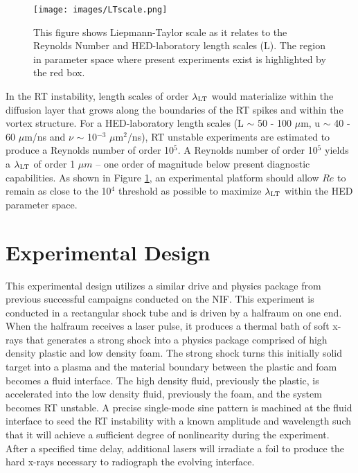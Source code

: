 \documentclass[%
 aip,
 amsmath,amssymb,
 reprint,
 floatfix
]{revtex4-1}
\begin{document}
 
  \begin{figure}
 \begin{center}
 \texttt{[image: images/LTscale.png]}
 \caption{This figure shows Liepmann-Taylor scale as it relates to the Reynolds Number and HED-laboratory length scales (L). The region in parameter space where present experiments exist is highlighted by the red box. } 
 \label{fig:LTscale}
 \end{center}
 \end{figure}

 In the RT instability, length scales of order $\lambda_{\rm{LT}}$ would materialize within the diffusion layer that grows along the boundaries of the RT spikes and within the vortex structure.\cite{Robey:2003} For a HED-laboratory length scales (L $\sim$  50 - 100 $\mu$m, u $\sim$ 40 - 60  $\mu$m/ns and $\nu$ $\sim$ 10$^{-3}$ $\mu$m$^2$/ns), RT unstable experiments are estimated to produce a Reynolds number of order 10$^5$. A Reynolds number of order 10$^5$ yields a $\lambda_{\rm{LT}}$ of order 1 $\mu m$ -- one order of magnitude below present diagnostic capabilities. As shown in Figure \ref{fig:LTscale}, an experimental platform should allow $Re$ to remain as close to the 10$^4$ threshold as possible to maximize $\lambda_{\rm{LT}}$ within the HED parameter space.

 




\section{Experimental Design}
\noindent This experimental design utilizes a similar drive and physics package from previous successful campaigns conducted on the NIF. \cite{Nagel:2017, Robey:2003} This experiment is conducted in a rectangular shock tube and is driven by a halfraum on one end.  When the halfraum receives a laser pulse, it produces a thermal bath of soft x-rays that generates a strong shock into a physics package comprised of high density plastic and low density foam. The strong shock turns this initially solid target into a plasma and the material boundary between the plastic and foam becomes a fluid interface. The high density fluid, previously the plastic, is accelerated into the low density fluid, previously the foam, and the system becomes RT unstable.  A precise single-mode sine pattern is machined at the fluid interface to seed the RT instability with a known amplitude and wavelength such that it will achieve a sufficient degree of nonlinearity during the experiment.   After a specified time delay, additional lasers will irradiate a foil to produce the hard x-rays necessary to radiograph the evolving interface.  
\end{document}
